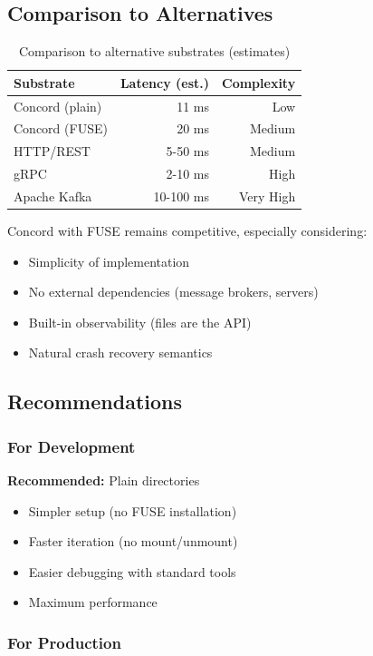 \documentclass[11pt]{article}
\begin{document}
\subsection{Comparison to Alternatives}

\begin{table}[h]
\centering
\begin{tabular}{lrr}
\toprule
\textbf{Substrate} & \textbf{Latency (est.)} & \textbf{Complexity} \\
\midrule
Concord (plain) & 11 ms & Low \\
Concord (FUSE) & 20 ms & Medium \\
HTTP/REST & 5-50 ms & Medium \\
gRPC & 2-10 ms & High \\
Apache Kafka & 10-100 ms & Very High \\
\bottomrule
\end{tabular}
\caption{Comparison to alternative substrates (estimates)}
\end{table}

Concord with FUSE remains competitive, especially considering:
\begin{itemize}
\item Simplicity of implementation
\item No external dependencies (message brokers, servers)
\item Built-in observability (files are the API)
\item Natural crash recovery semantics
\end{itemize}

\subsection{Recommendations}

\subsubsection{For Development}
\textbf{Recommended:} Plain directories
\begin{itemize}
\item Simpler setup (no FUSE installation)
\item Faster iteration (no mount/unmount)
\item Easier debugging with standard tools
\item Maximum performance
\end{itemize}

\subsubsection{For Production}
\end{document}
